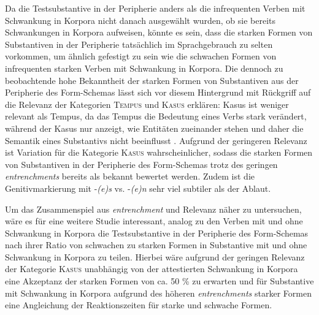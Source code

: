 Da die Testsubstantive in der Peripherie anders als die infrequenten Verben mit Schwankung in Korpora nicht danach ausgewählt wurden, ob sie bereits Schwankungen in Korpora aufweisen, könnte es sein, dass die starken Formen von Substantiven in der Peripherie tatsächlich im Sprachgebrauch zu selten vorkommen, um ähnlich gefestigt zu sein wie die schwachen Formen von infrequenten starken Verben mit Schwankung in Korpora. Die dennoch zu beobachtende hohe Bekanntheit der starken Formen von Substantiven aus der Peripherie des Form-Schemas lässt sich vor diesem Hintergrund mit Rückgriff auf die Relevanz der Kategorien \textsc{Tempus} und \textsc{Kasus} erklären: Kasus ist weniger relevant als Tempus, da das Tempus die Bedeutung eines Verbs stark verändert, während der Kasus nur anzeigt, wie Entitäten zueinander stehen und daher die Semantik eines Substantivs nicht beeinflusst \parencites[179--180]{Nubling.2004}[158--159]{Nubling.2016}. Aufgrund der geringeren Relevanz ist Variation für die Kategorie \textsc{Kasus} wahrscheinlicher, sodass die starken Formen von Substantiven in der Peripherie des Form-Schemas trotz des geringen \textit{entrenchments} bereits als bekannt bewertet werden. Zudem ist die Genitivmarkierung mit -\textit{(e)s} vs. -\textit{(e)n} sehr viel subtiler als der Ablaut. 

 
Um das Zusammenspiel aus \textit{entrenchment} und Relevanz näher zu untersuchen, wäre es für eine weitere Studie interessant, analog zu den Verben mit und ohne Schwankung in Korpora die Testsubstantive in der Peripherie des Form-Schemas nach ihrer Ratio von schwachen zu starken Formen in Substantive mit und ohne Schwankung in Korpora zu teilen. Hierbei wäre aufgrund der geringen Relevanz der Kategorie \textsc{Kasus} unabhängig von der attestierten Schwankung in Korpora eine Akzeptanz der starken Formen von ca. 50 \% zu erwarten und für Substantive mit Schwankung in Korpora aufgrund des höheren \textit{entrenchments} starker Formen eine Angleichung der Reaktionszeiten für starke und schwache Formen.

